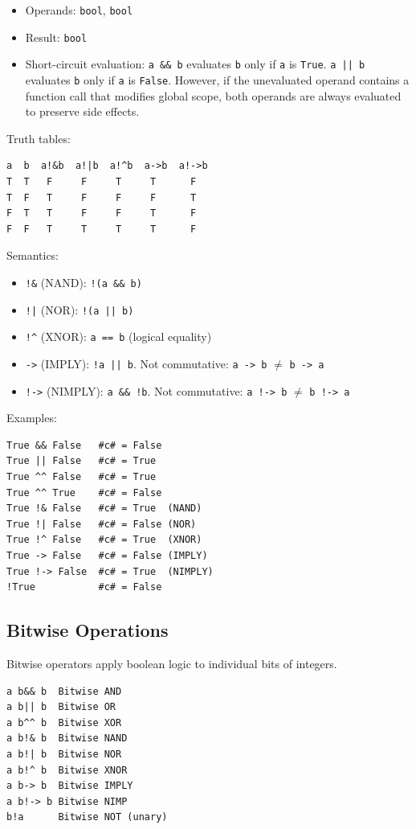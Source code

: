 \begin{itemize}
\item Operands: \texttt{bool}, \texttt{bool}
\item Result: \texttt{bool}
\item Short-circuit evaluation: \texttt{a \&\& b} evaluates \texttt{b} only if \texttt{a} is \texttt{True}. \texttt{a || b} evaluates \texttt{b} only if \texttt{a} is \texttt{False}. However, if the unevaluated operand contains a function call that modifies global scope, both operands are always evaluated to preserve side effects.
\end{itemize}

Truth tables:
\begin{verbatim}
a  b  a!&b  a!|b  a!^b  a->b  a!->b
T  T   F     F     T     T      F
T  F   T     F     F     F      T
F  T   T     F     F     T      F
F  F   T     T     T     T      F
\end{verbatim}

Semantics:
\begin{itemize}
\item \texttt{!\&} (NAND): \texttt{!(a \&\& b)}
\item \texttt{!|} (NOR): \texttt{!(a || b)}
\item \texttt{!}\texttt{\^{}} (XNOR): \texttt{a == b} (logical equality)
\item \texttt{->} (IMPLY): \texttt{!a || b}. Not commutative: \texttt{a -> b} $\neq$ \texttt{b -> a}
\item \texttt{!->} (NIMPLY): \texttt{a \&\& !b}. Not commutative: \texttt{a !-> b} $\neq$ \texttt{b !-> a}
\end{itemize}

Examples:
\begin{verbatim}
True && False   #c# = False
True || False   #c# = True
True ^^ False   #c# = True
True ^^ True    #c# = False
True !& False   #c# = True  (NAND)
True !| False   #c# = False (NOR)
True !^ False   #c# = True  (XNOR)
True -> False   #c# = False (IMPLY)
True !-> False  #c# = True  (NIMPLY)
!True           #c# = False
\end{verbatim}

\subsection{Bitwise Operations}
Bitwise operators apply boolean logic to individual bits of integers.
\begin{verbatim}
a b&& b  Bitwise AND
a b|| b  Bitwise OR
a b^^ b  Bitwise XOR
a b!& b  Bitwise NAND
a b!| b  Bitwise NOR
a b!^ b  Bitwise XNOR
a b-> b  Bitwise IMPLY
a b!-> b Bitwise NIMP
b!a      Bitwise NOT (unary)
\end{verbatim}

